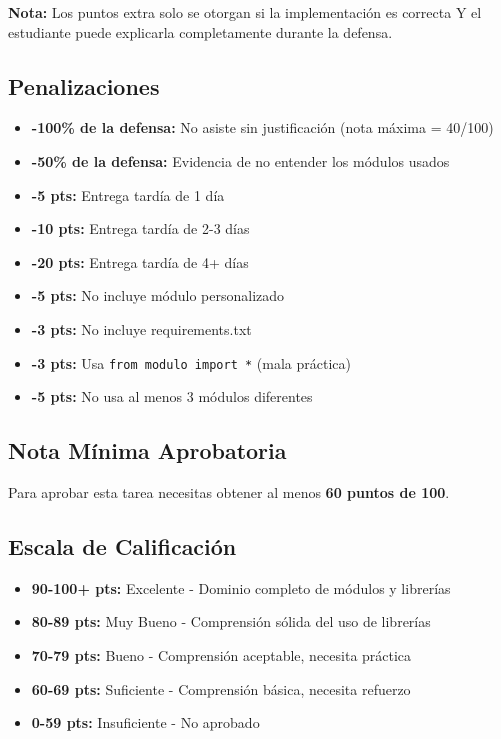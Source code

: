 \documentclass[12pt,a4paper]{article}
\begin{document}
\textbf{Nota:} Los puntos extra solo se otorgan si la implementación es correcta Y el estudiante puede explicarla completamente durante la defensa.

\subsection{Penalizaciones}

\begin{itemize}[leftmargin=*]
    \item \textbf{-100\% de la defensa:} No asiste sin justificación (nota máxima = 40/100)
    \item \textbf{-50\% de la defensa:} Evidencia de no entender los módulos usados
    \item \textbf{-5 pts:} Entrega tardía de 1 día
    \item \textbf{-10 pts:} Entrega tardía de 2-3 días
    \item \textbf{-20 pts:} Entrega tardía de 4+ días
    \item \textbf{-5 pts:} No incluye módulo personalizado
    \item \textbf{-3 pts:} No incluye requirements.txt
    \item \textbf{-3 pts:} Usa \texttt{from modulo import *} (mala práctica)
    \item \textbf{-5 pts:} No usa al menos 3 módulos diferentes
\end{itemize}

\subsection{Nota Mínima Aprobatoria}

Para aprobar esta tarea necesitas obtener al menos \textbf{60 puntos de 100}.

\subsection{Escala de Calificación}

\begin{itemize}
    \item \textbf{90-100+ pts:} Excelente - Dominio completo de módulos y librerías
    \item \textbf{80-89 pts:} Muy Bueno - Comprensión sólida del uso de librerías
    \item \textbf{70-79 pts:} Bueno - Comprensión aceptable, necesita práctica
    \item \textbf{60-69 pts:} Suficiente - Comprensión básica, necesita refuerzo
    \item \textbf{0-59 pts:} Insuficiente - No aprobado
\end{itemize}
\end{document}
